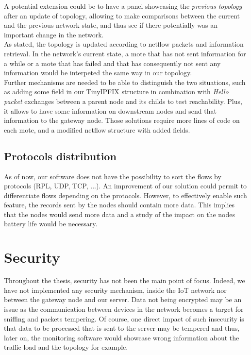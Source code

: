 A potential extension could be to have a panel showcasing the \textit{previous topology} after an update of topology, allowing to make comparisons between the current and the previous network state, and thus see if there potentially was an important change in the network.\\

As stated, the topology is updated according to netflow packets and information retrieval. In the network's current state, a mote that has not sent information for a while or a mote that has failed and that has consequently not sent any information would be interpeted the same way in our topology. \\

Further mechanisms are needed to be able to distinguish the two situations, such as adding some field in our TinyIPFIX structure in combination with \textit{Hello packet} exchanges between a parent node and its childs to test reachability. Plus, it allows to have some information on downstream nodes and send that information to the gateway node. Those solutions require more lines of code on each mote, and a modified netflow structure with added fields.

\subsection{Protocols distribution}

As of now, our software does not have the possibility to sort the flows by protocols (RPL, UDP, TCP, ...). An improvement of our solution could permit to differentiate flows depending on the protocols. However, to effectively enable such feature, the records sent by the nodes should contain more data. This implies that the nodes would send more data and a study of the impact on the nodes battery life would be necessary.

\section{Security}

Throughout the thesis, security has not been the main point of focus. Indeed, we have not implemented any security mechanism, inside the IoT network nor between the gateway node and our server. Data not being encrypted may be an issue as the communication between devices in the network becomes a target for sniffing and packets tempering. Of course, one direct impact of such insecurity is that data to be processed that is sent to the server may be tempered and thus, later on, the monitoring software would showcase wrong information about the traffic load and the topology for example.\\

